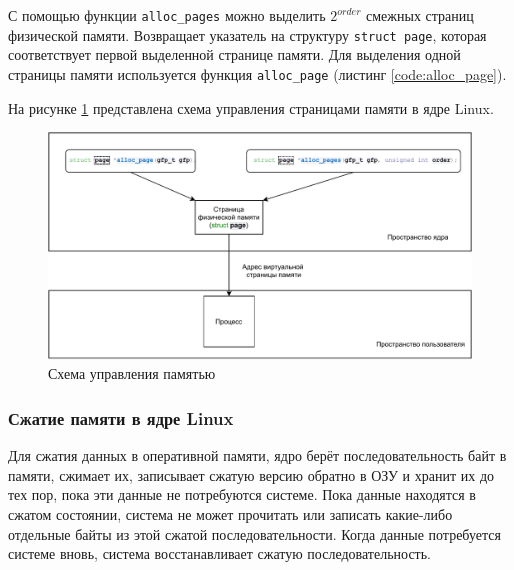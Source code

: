 
С помощью функции \texttt{alloc\_pages} можно выделить $2^{order}$ смежных страниц физической памяти. Возвращает указатель на структуру \texttt{struct page}, которая соответствует первой выделенной странице памяти. Для выделения одной страницы памяти используется функция \texttt{alloc\_page} (листинг \ref{code:alloc_page}).


На рисунке \ref{fig:memory_schema} представлена схема управления страницами памяти в ядре Linux.

\begin{figure}[h]
	\centering
	\includegraphics[width=\textwidth]{img/memory_schema.pdf}
	\caption{Схема управления памятью}
	\label{fig:memory_schema}
\end{figure}

\subsubsection{Сжатие памяти в ядре Linux}

Для сжатия данных в оперативной памяти, ядро берёт последовательность байт в памяти, сжимает их, записывает сжатую версию обратно в ОЗУ и хранит их до тех пор, пока эти данные не потребуются системе. Пока данные находятся в сжатом состоянии, система не может прочитать или записать какие-либо отдельные байты из этой сжатой последовательности. Когда данные потребуется системе вновь, система восстанавливает сжатую последовательность.

